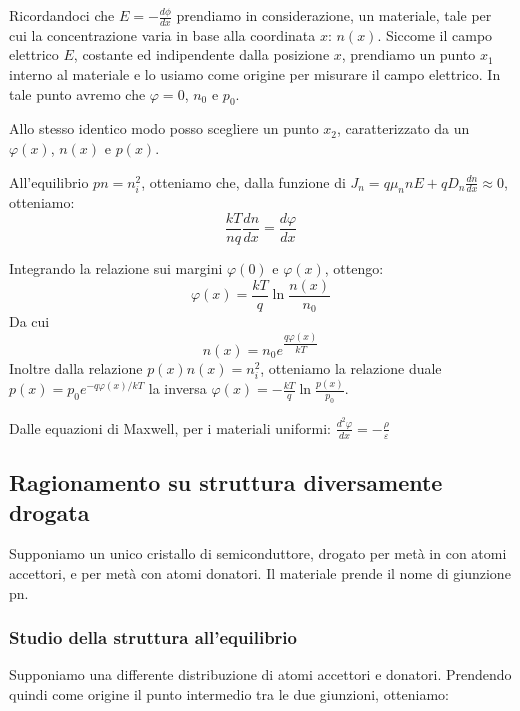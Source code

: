 \documentclass[../template]{subfiles}
\begin{document}
Ricordandoci che $E = -\frac{d\phi}{dx}$
prendiamo in considerazione, un materiale, tale per cui la concentrazione varia in base alla coordinata $x$: $n(x)$.
Siccome il campo elettrico $E$, costante ed indipendente dalla posizione $x$, prendiamo un punto $x_1$ interno al materiale e lo usiamo come origine per misurare il campo elettrico. In tale punto avremo che $\varphi = 0$, $n_0$ e $p_0$.

Allo stesso identico modo posso scegliere un punto $x_2$, caratterizzato da un $\varphi(x)$, $n(x)$ e $p(x)$.

All'equilibrio $pn = n_i^2$, otteniamo che, dalla funzione di $J_n = q \mu_n  n E + q D_n \frac{dn}{dx} \approx 0$, otteniamo:
\[
    \frac{kT}{nq} \frac{dn}{dx} = \frac{d\varphi}{dx}
\]

Integrando la relazione sui margini $\varphi(0)$ e $\varphi(x)$, ottengo:
\[
    \varphi(x) = \frac{kT}{q} \ln \frac{n(x)}{n_0}
\]
Da cui
\[
    n(x) = n_0 e^{\dfrac{q\varphi(x)}{kT}}
\]
Inoltre dalla relazione $p(x) n(x) = n_i^2$, otteniamo la relazione duale $p(x) = p_0 e^{-q\varphi(x) / kT}$ la inversa $\varphi(x) = - \frac{kT}{q} \ln \frac{p(x)}{p_0}$.

Dalle equazioni di Maxwell, per i materiali uniformi: $\frac{d^2 \varphi}{dx} = -\frac{\rho}{\varepsilon}$
\subsection{Ragionamento su struttura diversamente drogata}
Supponiamo un unico cristallo di semiconduttore, drogato per metà in con atomi accettori, e per metà con atomi donatori.
Il materiale prende il nome di giunzione pn.


\subsubsection{Studio della struttura all'equilibrio}

Supponiamo una differente distribuzione di atomi accettori e donatori. Prendendo quindi come origine il punto intermedio tra le due giunzioni, otteniamo:

\begin{figure}[h]
    \centering
\end{figure}
\end{document}
